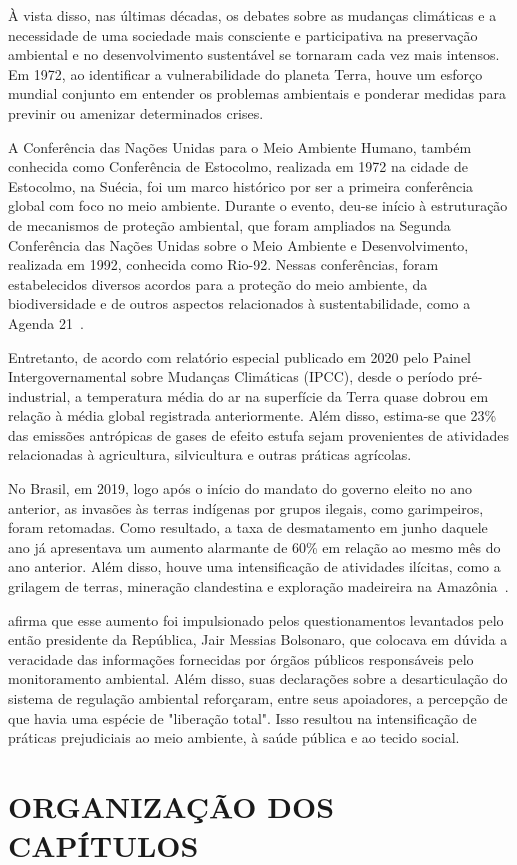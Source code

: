     À vista disso, nas últimas décadas, os debates sobre as mudanças climáticas e a necessidade de uma sociedade 
    mais consciente e participativa na preservação ambiental e no desenvolvimento sustentável se tornaram cada 
    vez mais intensos. Em 1972, ao identificar a vulnerabilidade do planeta Terra, houve um esforço mundial conjunto
    em entender os problemas ambientais e ponderar medidas para previnir ou amenizar determinados crises.
    
    A Conferência das Nações Unidas para o Meio Ambiente Humano, também conhecida como Conferência de Estocolmo, 
    realizada em 1972 na cidade de Estocolmo, na Suécia, foi um marco histórico por ser a primeira conferência 
    global com foco no meio ambiente. Durante o evento, deu-se início à estruturação de mecanismos de proteção 
    ambiental, que foram ampliados na Segunda Conferência das Nações Unidas sobre o Meio Ambiente e 
    Desenvolvimento, realizada em 1992, conhecida como Rio-92. Nessas conferências, foram estabelecidos 
    diversos acordos para a proteção do meio ambiente, da biodiversidade e de outros aspectos relacionados à 
    sustentabilidade, como a Agenda 21~\cite{passos2009}.


    Entretanto, de acordo com relatório especial publicado em 2020 pelo Painel Intergovernamental sobre Mudanças Climáticas (IPCC), 
    desde o período pré-industrial, a temperatura média do ar na superfície da Terra quase dobrou em relação à média 
    global registrada anteriormente. Além disso, estima-se que 23\% das emissões antrópicas de gases de efeito estufa 
    sejam provenientes de atividades relacionadas à agricultura, silvicultura e outras práticas agrícolas.

    No Brasil, em 2019, logo após o início do mandato do governo eleito no ano anterior, as invasões às terras 
    indígenas por grupos ilegais, como garimpeiros, foram retomadas. Como resultado, a taxa de desmatamento em 
    junho daquele ano já apresentava um aumento alarmante de 60\% em relação ao mesmo mês do ano anterior. 
    Além disso, houve uma intensificação de atividades ilícitas, como a grilagem de terras, mineração clandestina 
    e exploração madeireira na Amazônia~\cite{barretto2020}.

     afirma que esse aumento foi impulsionado pelos questionamentos levantados pelo então 
    presidente da República, Jair Messias Bolsonaro, que colocava em dúvida a veracidade das informações fornecidas 
    por órgãos públicos responsáveis pelo monitoramento ambiental. Além disso, suas declarações sobre a desarticulação do sistema de 
    regulação ambiental reforçaram, entre seus apoiadores, a percepção de que havia uma espécie de "liberação total".
    Isso resultou na intensificação de práticas prejudiciais ao meio ambiente, à saúde pública e ao tecido social.

    


\section{ORGANIZAÇÃO DOS CAPÍTULOS}
